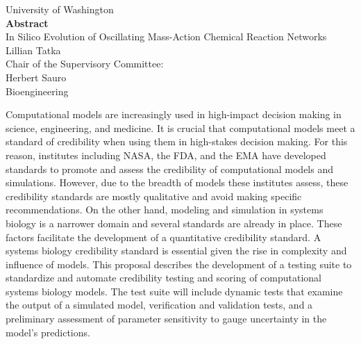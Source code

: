 \documentclass[12pt]{report}
\begin{document}
\begin{center}
University of Washington\\
\vspace*{\fill}
\textbf{Abstract} \\
\vspace*{\fill}
In Silico Evolution of Oscillating Mass-Action Chemical Reaction Networks\\
\vspace*{\fill}
Lillian Tatka\\
\vspace*{\fill}
Chair of the Supervisory Committee:\\
Herbert Sauro\\
Bioengineering
\end{center}
\vspace*{\fill}
Computational models are increasingly used in high-impact decision making in science, engineering, and medicine. It is crucial that computational models meet a standard of credibility when using them in high-stakes decision making. For this reason, institutes including NASA, the FDA, and the EMA have developed standards to promote and assess the credibility of computational models and simulations. However, due to the breadth of models these institutes assess, these credibility standards are mostly qualitative and avoid making specific recommendations. On the other hand, modeling and simulation in systems biology is a narrower domain and several standards are already in place. These factors facilitate the development of a quantitative credibility standard. A systems biology credibility standard is essential given the rise in complexity and influence of models. This proposal describes the development of a testing suite to standardize and automate credibility testing and scoring of computational systems biology models. The test suite will include dynamic tests that examine the output of a simulated model, verification and validation tests, and a preliminary assessment of parameter sensitivity to gauge uncertainty in the model's predictions. 

\tableofcontents

\listoffigures

\listoftables
\end{document}
